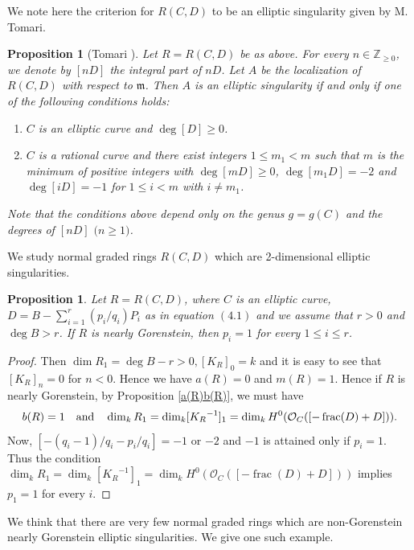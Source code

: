 \documentclass[12pt]{amsart}
\newtheorem{prop}[thm]{Proposition}
\theoremstyle{definition}
\theoremstyle{remark}
\numberwithin{equation}{section}
\DeclareMathOperator{\FRC}{frac}
\newcommand{\m}{\mathfrak m}
\newcommand{\KiR}{{K_R}^{-1}}
\newcommand{\Z}{\mathbb Z}
\newcommand{\cO}{\mathcal O}
\renewcommand{\:}{\colon}
\begin{document}
\par 
We note here the criterion for $R(C,D)$ to be 
 an elliptic singularity given by M. Tomari. 

\begin{prop}[\textrm{Tomari \cite[Corollary 3.9]{tomari.max}}]\label{Tomari}
Let $R=R(C,D)$  be as above. 
For every $n\in \Z_{\ge 0}$, we denote by $[nD]$ the  integral part of $nD$. 
Let $A$ be the localization of $R(C,D)$ with respect to $\m$. 
Then $A$ is an elliptic singularity if and only if  one of the following conditions holds:
\begin{enumerate}
\item $C$ is an elliptic curve and $\deg [D] \ge 0$.
\item $C$ is a rational curve and there exist integers 
$1\le m_1 < m$ such that 
$m$ is the minimum of positive integers with $\deg [mD] \ge 0$, 
$\deg [m_1D] = -2$ and $\deg [iD] = -1$  for $1 \le i <m$ with $i\ne m_1$.
\end{enumerate}
Note that the conditions above depend only on the genus $g=g(C)$ and the degrees of $[nD]$ 
$($$n\ge 1$$)$.
\end{prop}

\par 
We study normal graded  rings $R(C,D)$ which are 2-dimensional elliptic singularities. 

\begin{prop}\label{ell1}
Let $R=R(C,D)$, where $C$ is an elliptic curve, 
$D = B - \sum_{i=1}^r (p_i/q_i)P_i$ as 
in equation $(4.1)$ and we assume that $r>0$ and $\deg B > r$. 
If $R$ is nearly Gorenstein, then $p_i=1$ for every $1\le i \le r$. 
\end{prop}

\begin{proof}  
Then $\dim R_1 = \deg B - r >0, [K_R]_0=k$ and 
it is easy to see that $[K_R]_n = 0$ for $n< 0$. 
Hence we have $a(R)=0$ and $m(R)=1$. 
Hence if $R$ is nearly Gorenstein,  by Proposition \ref{a(R)b(R)}, 
we must have 
\[
b(R)=1 \quad {\rm and} \quad \dim_k R_1 = \dim_k [\KiR]_1= 
\dim_k H^0(\cO_C([-\FRC(D) +D])).
\] 
Now, $[-(q_i -1)/q_i - p_i/q_i]= -1$ or $-2$ and $-1$ is attained only if $p_i=1$. 
Thus the condition 
$\dim_k R_1 = \dim_k [\KiR]_1 = \dim_k H^0(\cO_C([-\FRC(D) +D]))$ 
implies $p_1=1$ for every $i$. 
\end{proof}

\par  
We think that there are very few normal graded rings which are 
non-Gorenstein nearly Gorenstein elliptic singularities. 
We give one such example.
\end{document}
